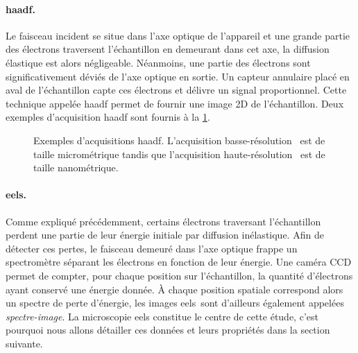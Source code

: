     \paragraph{\gls{haadf}.} Le faisceau incident se situe dans l'axe optique de l'appareil et une grande partie des électrons traversent l'échantillon en demeurant dans cet axe, la diffusion élastique est alors négligeable. Néanmoins, une partie des électrons sont significativement déviés de l'axe optique en sortie.  Un capteur annulaire placé en aval de l'échantillon capte ces électrons et délivre un signal proportionnel. Cette technique appelée \gls{haadf} permet de fournir une image 2D de l'échantillon. Deux exemples d'acquisition \gls{haadf} sont fournis à la \cref{fig-chap2-haadf-ex}.

    \begin{figure}%
    	\centering
        \hspace{1em}
        \caption{\protect\label{fig-chap2-haadf-ex}Exemples d'acquisitions \gls{haadf}. L'acquisition basse-résolution~\protect{} est de taille micrométrique  tandis que l'acquisition haute-résolution~\protect{} est de taille nanométrique.}
     \end{figure}


    \paragraph*{\gls{eels}.} Comme expliqué précédemment, certains électrons traversant l'échantillon  perdent une partie de leur énergie initiale par diffusion inélastique. Afin de détecter ces pertes, le faisceau demeuré dans l'axe optique frappe un spectromètre séparant les électrons en fonction de leur énergie. Une caméra CCD permet de compter, pour chaque position sur l'échantillon, la quantité d'électrons ayant conservé une énergie donnée. \`A chaque position spatiale correspond alors un spectre de perte d'énergie, les images \gls{eels} sont d'ailleurs également appelées \emph{spectre-image}. La microscopie \gls{eels} constitue le centre de cette étude, c'est pourquoi nous allons détailler ces données et leurs propriétés dans la section suivante.


